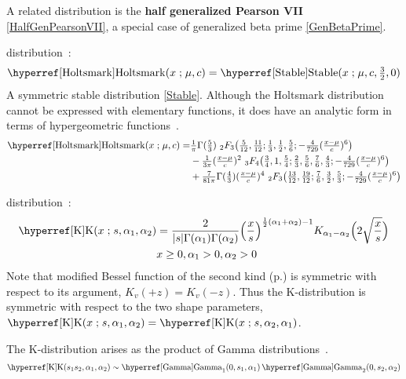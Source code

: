 A related distribution is the {\bf half generalized Pearson VII} \eqref{HalfGenPearsonVII}, a special case of generalized beta prime 
\eqref{GenBetaPrime}.


\secbreak
 distribution~\cite{Holtsmark1919}:
\begin{align}
	\label{Holtsmark}
	\opr{Holtsmark}(x\given \mu,c) = \opr{Stable}(x\given \mu,c,\sfrac{3}{2},0)  \checked
\end{align}
A symmetric stable distribution \eqref{Stable}.
Although the Holtsmark distribution cannot be expressed with elementary functions, it does have an analytic form in terms of hypergeometric functions~\cite{Garoni2002}.
\begin{align*}
\opr{Holtsmark}(x\given \mu,c)
=& \sfrac{1}{\pi} {\Gamma(\tfrac{5}{3})}\ {}_2F_3\bigl(\tfrac{5}{12},\tfrac{11}{12};\tfrac{1}{3},\tfrac{1}{2},\sfrac{5}{6};-\sfrac{4}{729}(\sfrac{x-\mu}{c})^6\bigr) \\
& {} - \sfrac{1}{3\pi} (\sfrac{x-\mu}{c})^2 \ {}_3F_4\bigl( \sfrac{3}{4},1,\sfrac{5}{4};\sfrac{2}{3},\sfrac{5}{6},\sfrac{7}{6},\sfrac{4}{3};-\sfrac{4}{729}(\sfrac{x-\mu}{c})^6 \bigr) \\
&  {}  + \sfrac{7}{81\pi}   {\Gamma(\sfrac{4}{3})}  (\sfrac{x-\mu}{c})^4 \  {}_2F_3\bigl( \sfrac{13}{12},\sfrac{19}{12};\sfrac{7}{6},\sfrac{3}{2},\sfrac{5}{3};- \sfrac{4}{729} (\sfrac{x-\mu}{c})^6 \bigr) \checked
\end{align*}

\secbreak
{} distribution~\cite{Malik1968,Jakeman1978,Redding1999,Withers2013}:
\begin{align}
\label{K}
\opr{K}(x\given s, \alpha_1, \alpha_2) &= 
\frac{2}{|s| \Gamma(\alpha_1)\Gamma(\alpha_2)}
 \Bigl( \frac{x}{s} \Bigr)^{\half(\alpha_1+\alpha_2 )-1} K_{\alpha_1-\alpha_2} \Bigl(2 \sqrt{\frac{x}{s}} \Bigr) \checked
\\
& x\geq 0, \alpha_1>0, \alpha_2>0 \notag
\end{align}
Note that modified Bessel function of the second kind  (p.\pageref{ModBesselSecond}) is symmetric with respect to its argument,   $K_{v}(+z)=   K_{v}(-z)$. Thus the K-distribution is symmetric with respect to the two shape parameters, $\opr{K}(x\given s, \alpha_1, \alpha_2)  = \opr{K}(x\given s, \alpha_2,\alpha_1)$.

The K-distribution arises as the product of Gamma distributions~\cite{Malik1968,Redding1999,Withers2013}.
\begin{align*}
\opr{K}(s_1 s_2, \alpha_1, \alpha_2)  
\sim  \opr{Gamma}_1(0,s_1, \alpha_1)  \opr{Gamma}_2(0,s_2, \alpha_2) \checked
\end{align*}



